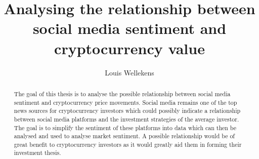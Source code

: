 \documentclass[english]{hogent-article}
\title{Analysing the relationship between social media sentiment and cryptocurrency value }
\author{Louis Wellekens}
\begin{document}
\begin{abstract}
  The goal of this thesis is to analyse the possible relationship between social media sentiment and cryptocurrency price movements. Social media remains one of the top news sources for cryptocurrency investors which could possibly indicate a relationship between social media platforms and the investment strategies of the average investor. The goal is to simplify the sentiment of these platforms into data which can then be analysed and used to analyse market sentiment. A possible relationship would be of great benefit to cryptocurrency investors as it would greatly aid them in forming their investment thesis.
\end{abstract}

\tableofcontents



\printbibliography[heading=bibintoc]
\end{document}

